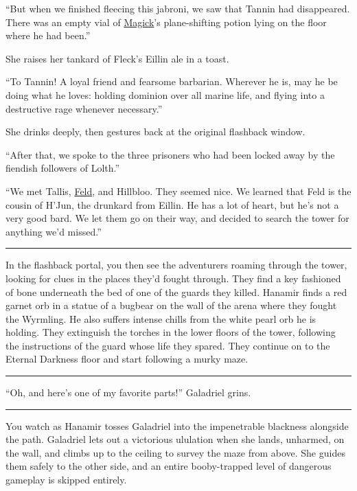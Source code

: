 \documentclass[smalldemyvopaper,11pt,twoside,onecolumn,openright,extrafontsizes]{memoir}
\begin{document}
``But when we finished fleecing this jabroni, we saw that Tannin had
disappeared. There was an empty vial of
\href{/characters/magick/}{Magick}'s plane-shifting potion lying on the
floor where he had been.''

She raises her tankard of Fleck's Eillin ale in a toast.

``To Tannin! A loyal friend and fearsome barbarian. Wherever he is, may
he be doing what he loves: holding dominion over all marine life, and
flying into a destructive rage whenever necessary.''

She drinks deeply, then gestures back at the original flashback window.

``After that, we spoke to the three prisoners who had been locked away
by the fiendish followers of Lolth.''

``We met Tallis, \href{/characters/feld/}{Feld}, and Hillbloo. They
seemed nice. We learned that Feld is the cousin of H'Jun, the drunkard
from Eillin. He has a lot of heart, but he's not a very good bard. We
let them go on their way, and decided to search the tower for anything
we'd missed.''

\begin{center}\rule{0.5\linewidth}{\linethickness}\end{center}

In the flashback portal, you then see the adventurers roaming through
the tower, looking for clues in the places they'd fought through. They
find a key fashioned of bone underneath the bed of one of the guards
they killed. Hanamir finds a red garnet orb in a statue of a bugbear on
the wall of the arena where they fought the Wyrmling. He also suffers
intense chills from the white pearl orb he is holding. They extinguish
the torches in the lower floors of the tower, following the instructions
of the guard whose life they spared. They continue on to the Eternal
Darkness floor and start following a murky maze.

\begin{center}\rule{0.5\linewidth}{\linethickness}\end{center}

``Oh, and here's one of my favorite parts!'' Galadriel grins.

\begin{center}\rule{0.5\linewidth}{\linethickness}\end{center}

You watch as Hanamir tosses Galadriel into the impenetrable blackness
alongside the path. Galadriel lets out a victorious ululation when she
lands, unharmed, on the wall, and climbs up to the ceiling to survey the
maze from above. She guides them safely to the other side, and an entire
booby-trapped level of dangerous gameplay is skipped entirely.
\end{document}
